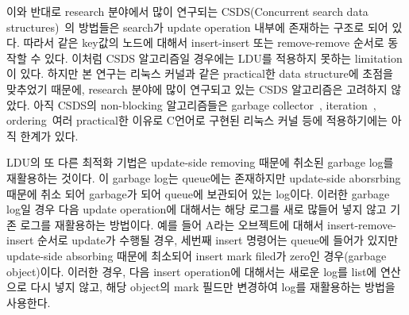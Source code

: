 \fi





\ifkor
이와 반대로 research 분야에서 많이 연구되는 CSDS(Concurrent search data
structures)~\cite{David2015ASYNCHRONIZED}의 방법들은 search가 update operation 내부에
존재하는 구조로 되어 있다.
따라서 같은 key값의 노드에 대해서 insert-insert 또는 remove-remove 순서로 동작할 수 있다.
이처럼 CSDS 알고리즘일 경우에는 LDU를 적용하지 못하는 limitation이 있다.
하지만 본 연구는 리눅스 커널과 같은 practical한 data structure에 초점을 맞추었기 때문에, 
research 분야에 많이 연구되고 있는 CSDS 알고리즘은 고려하지 않았다.
아직 CSDS의 non-blocking 알고리즘들은 garbage collector~\cite{AlBahra2013NAS},
iteration~\cite{petrank2013lock}, ordering~\cite{zhang2013practical}여러
practical한 이유로 C언어로 구현된 리눅스 커널 등에 적용하기에는 아직 한계가 있다.
\else











\fi


\ifkor
LDU의 또 다른 최적화 기법은 update-side removing 때문에 취소된 garbage log를 재활용하는 것이다.
이 garbage log는 queue에는 존재하지만 update-side aborsrbing 때문에 취소 되어 garbage가 되어 queue에
보관되어 있는 log이다. 
이러한 garbage log일 경우 다음 update operation에 대해서는 해당 로그를 새로 많들어 넣지 않고 기존 로그를 재활용하는
방법이다.
예를 들어 A라는 오브젝트에 대해서 insert-remove-insert 순서로 update가 수행될 경우, 세번째 insert 명령어는
queue에 들어가 있지만 update-side absorbing 때문에 최소되어 insert mark filed가 zero인
경우(garbage object)이다.
이러한 경우, 다음 insert operation에 대해서는 새로운 log를 list에 연산으로 다시 넣지 않고, 해당 object의 mark
필드만 변경하여 log를 재활용하는 방법을 사용한다.
\else


